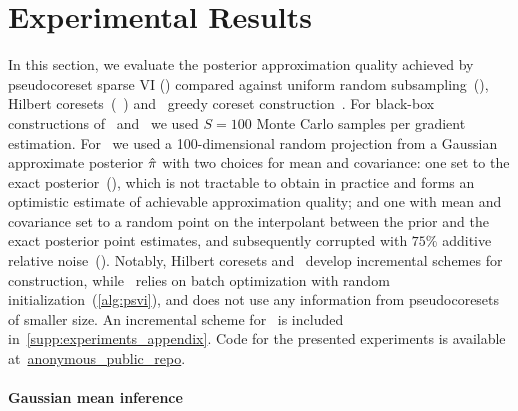 \section{Experimental Results}
\label{sec:experiments}
In this section, we evaluate the posterior approximation quality achieved by
pseudocoreset sparse VI (\psvi) compared against uniform random subsampling~(\uniform), Hilbert
coresets~(\giga~\citep{campbell18}) and \sparsevi~greedy coreset
construction~\citep{campbell19neurips}.  For black-box constructions of \sparsevi~and \psvi~we used $S =
100$ Monte Carlo samples per gradient estimation. For \giga~we used a
100-dimensional random projection from a Gaussian approximate posterior $\hat{\pi}$
with  two choices for mean and covariance: one set to the exact
posterior~(\optimal), which is not tractable to obtain in practice and forms an
optimistic estimate of achievable approximation quality; and one with mean and
covariance set to a random point on the interpolant between the prior and the
exact posterior point estimates, and subsequently corrupted with $75\%$
additive relative noise~(\realistic). Notably, Hilbert coresets and
\sparsevi~develop incremental schemes for construction, while \psvi~relies on
batch optimization with random initialization~(\cref{alg:psvi}), and does not
use any information from pseudocoresets of smaller size. An incremental scheme
for \sparsevi~is included in~\cref{supp:experiments_appendix}. Code for the
presented experiments is available at~\href{code_url}{anonymous\_public\_repo}. 

\paragraph{Gaussian mean inference}
\label{section:gaussian_experiment}

